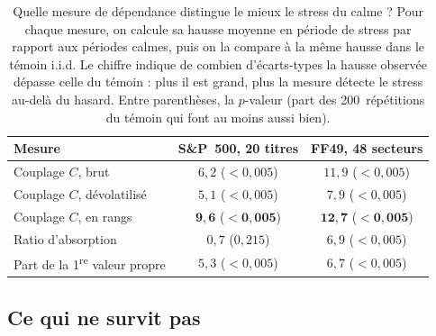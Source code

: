 \documentclass[11pt]{article}
\theoremstyle{definition}
\begin{document}
\begin{table}[htbp]
\centering
\small
\begin{tabular}{@{}lcc@{}}
\toprule
Mesure & S\&P~500, 20 titres & FF49, 48 secteurs \\
\midrule
Couplage $C$, brut & $6{,}2$ ($<0{,}005$) & $11{,}9$ ($<0{,}005$) \\
Couplage $C$, dévolatilisé & $5{,}1$ ($<0{,}005$) & $7{,}9$ ($<0{,}005$) \\
Couplage $C$, en rangs & $\mathbf{9{,}6}$ ($\mathbf{<0{,}005}$) & $\mathbf{12{,}7}$ ($\mathbf{<0{,}005}$) \\
Ratio d'absorption & $0{,}7$ ($0{,}215$) & $6{,}9$ ($<0{,}005$) \\
Part de la 1\textsuperscript{re} valeur propre & $5{,}3$ ($<0{,}005$) & $6{,}7$ ($<0{,}005$) \\
\bottomrule
\end{tabular}
\caption{Quelle mesure de dépendance distingue le mieux le stress du calme ?
Pour chaque mesure, on calcule sa hausse moyenne en période de stress par
rapport aux périodes calmes, puis on la compare à la même hausse dans le
témoin i.i.d. Le chiffre indique de combien d'écarts-types la hausse observée
dépasse celle du témoin : plus il est grand, plus la mesure détecte le stress
au-delà du hasard. Entre parenthèses, la $p$-valeur (part des 200~répétitions
du témoin qui font au moins aussi bien).}
\label{tab:cb-measures}
\end{table}

\subsection{Ce qui ne survit pas}
\end{document}
